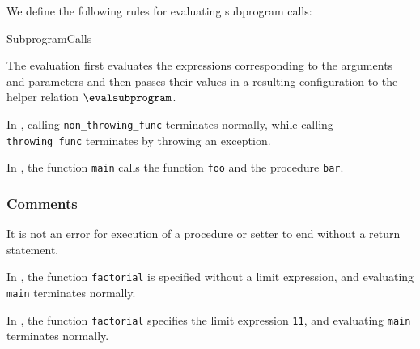 We define the following rules for evaluating subprogram calls:
\begin{SemanticsRuleList}{SubprogramCalls}


The evaluation first evaluates the expressions corresponding to the arguments
and parameters and then passes their values in a resulting configuration
to the helper relation $\evalsubprogram$.

In , calling \verb|non_throwing_func| terminates normally,
while calling \\
\verb|throwing_func| terminates by throwing an exception.




In ,
the function \texttt{main} calls the function \texttt{foo} and the procedure \texttt{bar}.



\subsubsection{Comments}

It is not an error for execution of a procedure or setter to end without a
return statement.


In , the function \verb|factorial| is specified without a limit expression,
and evaluating \verb|main| terminates normally.

In , the function \verb|factorial| specifies the limit expression \verb|11|,
and evaluating \verb|main| terminates normally.


\end{SemanticsRuleList}
